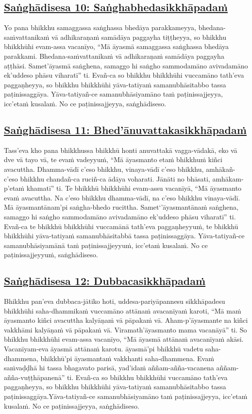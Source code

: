 \subsection*{\hyperref[comm10]{Saṅghādisesa 10: Saṅghabhedasikkhāpadaṁ}}
\label{sd10}
Yo pana bhikkhu samaggassa saṅghassa bhedāya parakkameyya, bhedana-saṁvattanikaṁ vā adhikaraṇaṁ samādāya paggayha tiṭṭheyya, so bhikkhu bhikkhūhi evam-assa vacanīyo, “Mā āyasmā samaggassa saṅghassa bhedāya parakkami. Bhedana-saṁvattanikaṁ vā adhikaraṇaṁ samādāya paggayha aṭṭhāsi. Samet'āyasmā saṅghena, samaggo hi saṅgho sammodamāno avivadamāno ek'uddeso phāsu viharatī” ti. Evañ-ca so bhikkhu bhikkhūhi vuccamāno tath'eva paggaṇheyya, so bhikkhu bhikkhūhi yāva-tatiyaṁ samanubhāsitabbo tassa paṭinissaggāya. Yāva-tatiyañ-ce samanubhāsiyamāno taṁ paṭinissajjeyya, icc'etaṁ kusalaṁ. No ce paṭinissajjeyya, saṅghādiseso.

\subsection*{\hyperref[comm11]{Saṅghādisesa 11: Bhed'ānuvattakasikkhāpadaṁ}}
\label{sd11}
Tass'eva kho pana bhikkhussa bhikkhū honti anuvattakā vagga-vādakā, eko vā dve vā tayo vā, te evaṁ vadeyyuṁ, “Mā āyasmanto etaṁ bhikkhuṁ kiñci avacuttha. Dhamma-vādī c'eso bhikkhu, vinaya-vādī c'eso bhikkhu, amhākañ-c'eso bhikkhu chandañ-ca ruciñ-ca ādāya voharati. Jānāti no bhāsati, amhākam-p'etaṁ khamatī” ti. Te bhikkhū bhikkhūhi evam-assu vacanīyā, “Mā āyasmanto evaṁ avacuttha. Na c'eso bhikkhu dhamma-vādī, na c'eso bhikkhu vinaya-vādī. Mā āyasmantānam'pi saṅgha-bhedo rucittha. Samet‘'āyasmantānaṁ saṅghena, samaggo hi saṅgho sammodamāno avivadamāno ek'uddeso phāsu viharatī” ti. Evañ-ca te bhikkhū bhikkhūhi vuccamānā tath'eva paggaṇheyyuṁ, te bhikkhū bhikkhūhi yāva-tatiyaṁ samanubhāsitabbā tassa paṭinissaggāya. Yāva-tatiyañ-ce samanubhāsiyamānā taṁ paṭinissajjeyyuṁ, icc'etaṁ kusalaṁ. No ce paṭinissajjeyyuṁ, saṅghādiseso.

\subsection*{\hyperref[comm12]{Saṅghādisesa 12: Dubbacasikkhāpadaṁ}}
\label{sd12}
Bhikkhu pan'eva dubbaca-jātiko hoti, uddesa-pariyāpannesu sikkhāpadesu bhikkhūhi saha-dhammikaṁ vuccamāno attānaṁ avacanīyaṁ karoti, “Mā maṁ āyasmanto kiñci avacuttha kalyāṇaṁ vā pāpakaṁ vā. Aham-p'āyasmante na kiñci vakkhāmi kalyāṇaṁ vā pāpakaṁ vā. Viramath'āyasmanto mama vacanāyā” ti. So bhikkhu bhikkhūhi evam-assa vacanīyo, “Mā āyasmā attānaṁ avacanīyaṁ akāsi. Vacanīyam-eva āyasmā attānaṁ karotu. āyasmā'pi bhikkhū vadetu saha-dhammena, bhikkhū'pi āyasmantaṁ vakkhanti saha-dhammena. Evaṁ saṁvaḍḍhā hi tassa bhagavato parisā, yad'idaṁ aññam-añña-vacanena aññam-añña-vuṭṭhāpanenā” ti. Evañ-ca so bhikkhu bhikkhūhi vuccamāno tath'eva paggaṇheyya, so bhikkhu bhikkhūhi yāva-tatiyaṁ samanubhāsitabbo tassa paṭinissaggāya.Yāva-tatiyañ-ce samanubhāsiyamāno taṁ paṭinissajjeyya, icc'etaṁ kusalaṁ. No ce paṭinissajjeyya, saṅghādiseso.

